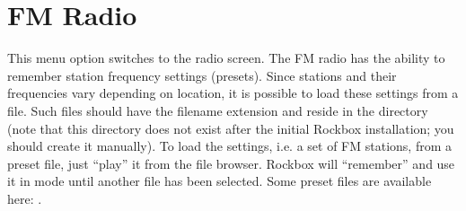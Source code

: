 \section{\label{ref:FMradio}FM Radio}

  This menu option switches to the radio screen.
  The FM radio has the ability to remember station frequency settings
  (presets). Since stations and their frequencies vary depending on location,
  it is possible to load these settings from a file. Such files should have
  the filename extension  and reside in the directory
   (note that this directory does not exist after
  the initial Rockbox installation; you should create it manually). To load
  the settings, i.e. a set of FM stations, from a preset file, just ``play''
  it from the file browser. Rockbox will ``remember'' and use it in
   mode until another file has been selected. Some preset
  files are available here: .


